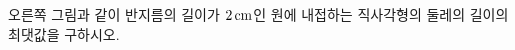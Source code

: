 \noindent\begin{minipage}[t]{0.58\linewidth}\vspace{0pt}\raggedright 오른쪽 그림과 같이 반지름의 길이가 $2\mkern3mu \mathrm{cm}$인 원에 내접하는 직사각형의 둘레의 길이의 최댓값을 구하시오.\end{minipage}\hfill\begin{minipage}[t]{0.4\linewidth}\vspace{0pt}\centering \resizebox{\ifdim\width>\linewidth\linewidth\else\width\fi}{!}{}\end{minipage}\par
